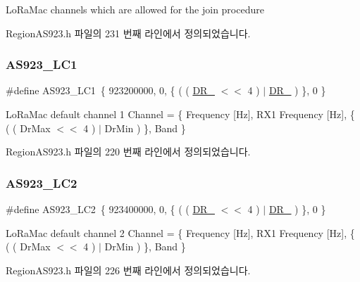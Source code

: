 Lo\+Ra\+Mac channels which are allowed for the join procedure 

Region\+A\+S923.\+h 파일의 231 번째 라인에서 정의되었습니다.

\mbox{\label{group___r_e_g_i_o_n_a_s923_gad552f8b259e81215d17bfd1f9c0f1198}} 
\subsubsection{\texorpdfstring{A\+S923\+\_\+\+L\+C1}{AS923\_LC1}}
{\footnotesize\ttfamily \#define A\+S923\+\_\+\+L\+C1~\{ 923200000, 0, \{ ( ( \mbox{\hyperlink{group___r_e_g_i_o_n_ga872e12c82020c02a7f70a1c6ed1375df}{D\+R\+\_}} $<$$<$ 4 ) $\vert$ \mbox{\hyperlink{group___r_e_g_i_o_n_ga6c4ef966b4f3d5eb7597b087f2b97095}{D\+R\+\_}} ) \}, 0 \}}

Lo\+Ra\+Mac default channel 1 Channel = \{ Frequency \mbox{[}Hz\mbox{]}, R\+X1 Frequency \mbox{[}Hz\mbox{]}, \{ ( ( Dr\+Max $<$$<$ 4 ) $\vert$ Dr\+Min ) \}, Band \} 

Region\+A\+S923.\+h 파일의 220 번째 라인에서 정의되었습니다.

\mbox{\label{group___r_e_g_i_o_n_a_s923_gae6a0cfa9079c4ab3097ac797506452d4}} 
\subsubsection{\texorpdfstring{A\+S923\+\_\+\+L\+C2}{AS923\_LC2}}
{\footnotesize\ttfamily \#define A\+S923\+\_\+\+L\+C2~\{ 923400000, 0, \{ ( ( \mbox{\hyperlink{group___r_e_g_i_o_n_ga872e12c82020c02a7f70a1c6ed1375df}{D\+R\+\_}} $<$$<$ 4 ) $\vert$ \mbox{\hyperlink{group___r_e_g_i_o_n_ga6c4ef966b4f3d5eb7597b087f2b97095}{D\+R\+\_}} ) \}, 0 \}}

Lo\+Ra\+Mac default channel 2 Channel = \{ Frequency \mbox{[}Hz\mbox{]}, R\+X1 Frequency \mbox{[}Hz\mbox{]}, \{ ( ( Dr\+Max $<$$<$ 4 ) $\vert$ Dr\+Min ) \}, Band \} 

Region\+A\+S923.\+h 파일의 226 번째 라인에서 정의되었습니다.

\mbox{\label{group___r_e_g_i_o_n_a_s923_ga996b3bad607207a4c54e5a2b253e5dfd}} 
